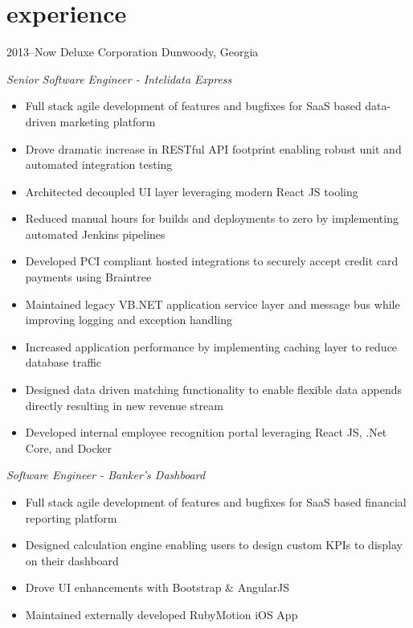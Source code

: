 \documentclass[]{friggeri-cv} %
\begin{document}
\section{experience}
\begin{entrylist}


\entry
{2013--Now}
{Deluxe Corporation}
{Dunwoody, Georgia}
{\raggedright
  \emph{Senior Software Engineer - Intelidata Express}
  \begin{itemize}
    \item Full stack agile development of features and bugfixes for SaaS based data-driven marketing platform 
    \item Drove dramatic increase in RESTful API footprint enabling robust unit and automated integration testing
    \item Architected decoupled UI layer leveraging modern React JS tooling
    \item Reduced manual hours for builds and deployments to zero by implementing automated Jenkins pipelines
    \item Developed PCI compliant hosted integrations to securely accept credit card payments using Braintree
    \item Maintained legacy VB.NET application service layer and message bus while improving logging and exception handling
    \item Increased application performance by implementing caching layer to reduce database traffic
    \item Designed data driven matching functionality to enable flexible data appends directly resulting in new revenue stream
    \item Developed internal employee recognition portal leveraging React JS, .Net Core, and Docker
  \end{itemize}
  \emph{Software Engineer - Banker's Dashboard}
  \begin{itemize}
    \item Full stack agile development of features and bugfixes for SaaS based financial reporting platform
    \item Designed calculation engine enabling users to design custom KPIs to display on their dashboard
    \item Drove UI enhancements with Bootstrap \& AngularJS
    \item Maintained externally developed RubyMotion iOS App
  \end{itemize}
}
\end{entrylist}
\end{document}
